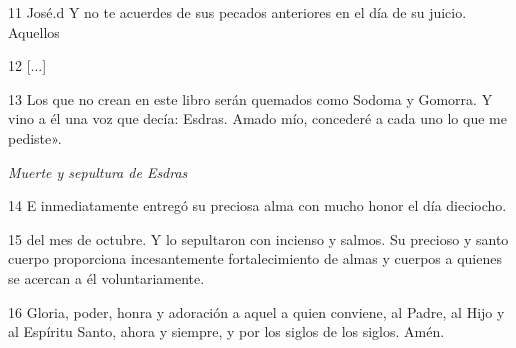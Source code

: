 \par 11 José.d Y no te acuerdes de sus pecados anteriores en el día de su juicio. Aquellos

\par 12 [...]

\par 13 Los que no crean en este libro serán quemados como Sodoma y Gomorra. Y vino a él una voz que decía: Esdras. Amado mío, concederé a cada uno lo que me pediste».

\par \textit{Muerte y sepultura de Esdras}

\par 14 E inmediatamente entregó su preciosa alma con mucho honor el día dieciocho.

\par 15 del mes de octubre. Y lo sepultaron con incienso y salmos. Su precioso y santo cuerpo proporciona incesantemente fortalecimiento de almas y cuerpos a quienes se acercan a él voluntariamente.

\par 16 Gloria, poder, honra y adoración a aquel a quien conviene, al Padre, al Hijo y al Espíritu Santo, ahora y siempre, y por los siglos de los siglos. Amén.

